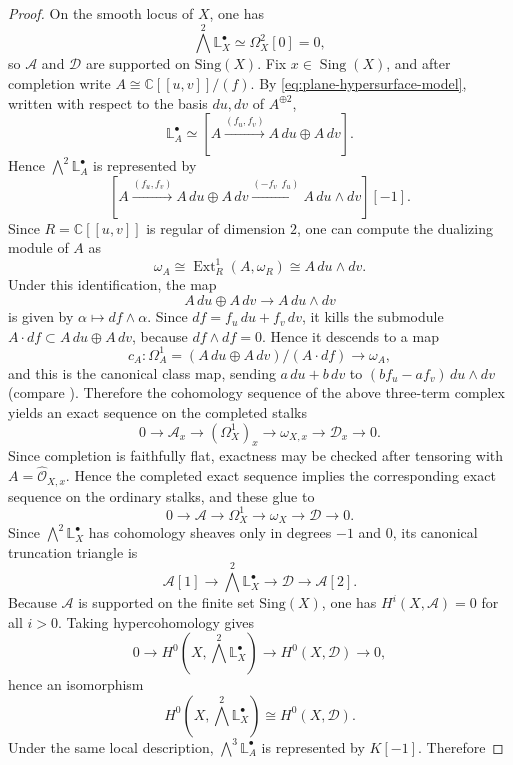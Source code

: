 \documentclass[12pt,reqno]{amsart}
\begin{document}
\begin{proof}
On the smooth locus of \(X\), one has
\[
\bigwedge^2\mathbb{L}^{\bullet}_X\simeq \Omega_X^2[0]=0,
\]
so \(\mathcal A\) and \(\mathcal D\) are supported on \(\mathrm{Sing}(X)\).
Fix \(x\in \operatorname{Sing}(X)\), and after completion write \(A\cong \mathbb{C}[[u,v]]/(f)\). By \eqref{eq:plane-hypersurface-model}, written with respect to the basis \(du,dv\) of \(A^{\oplus 2}\),
\[
\mathbb{L}^{\bullet}_A\simeq \left[A\xrightarrow{(f_u,f_v)}A\,du\oplus A\,dv\right].
\]
Hence \(\bigwedge^2\mathbb{L}^{\bullet}_A\) is represented by
\[
\left[
A\xrightarrow{(f_u,f_v)}
A\,du\oplus A\,dv
\xrightarrow{(-f_v\ \ f_u)}
A\,du\wedge dv
\right][-1].
\]
Since \(R=\mathbb{C}[[u,v]]\) is regular of dimension \(2\), one can compute the dualizing module of \(A\) as 
\[
\omega_A\cong \operatorname{Ext}^1_R(A,\omega_R)\cong A\,du\wedge dv.
\]
Under this identification, the map
\[
A\,du\oplus A\,dv\longrightarrow A\,du\wedge dv
\]
is given by \(\alpha\mapsto df\wedge \alpha\). Since \(df=f_u\,du+f_v\,dv\), it kills the
submodule \(A\cdot df\subset A\,du\oplus A\,dv\), because \(df\wedge df=0\). Hence it descends to a map
\[
c_A:\Omega_A^1=(A\,du\oplus A\,dv)/(A\cdot df)\longrightarrow \omega_A,
\]
and this is the canonical class map, sending \(a\,du+b\,dv\) to \((bf_u-af_v)\,du\wedge dv\)
(compare \cite[\href{https://stacks.math.columbia.edu/tag/0E9X}{Section 0E9X}]{stacks-project}). Therefore the cohomology sequence of the above three-term complex yields an exact sequence on the completed stalks
\[
0\to \mathcal A_x\to (\Omega_X^1)_x\to \omega_{X,x}\to \mathcal D_x\to 0.
\]
Since completion is faithfully flat, exactness may be checked after tensoring with
\(A=\widehat{\mathcal O}_{X,x}\). Hence the completed exact sequence implies the corresponding exact sequence on the ordinary stalks, and these glue to
\[
0\to \mathcal A\to \Omega_X^1\to \omega_X\to \mathcal D\to 0.
\]
Since \(\bigwedge^2\mathbb{L}^{\bullet}_X\) has cohomology sheaves only in degrees \(-1\) and \(0\), its canonical truncation triangle is
\[
\mathcal A[1]\longrightarrow \bigwedge^2\mathbb{L}^{\bullet}_X\longrightarrow \mathcal D\longrightarrow \mathcal A[2].
\]
Because \(\mathcal A\) is supported on the finite set \(\mathrm{Sing}(X)\), one has \(H^i(X,\mathcal A)=0\) for all \(i>0\). Taking hypercohomology gives
\[
0\longrightarrow H^0\!\left(X,\bigwedge^2\mathbb{L}^{\bullet}_X\right)\longrightarrow H^0(X,\mathcal D)\longrightarrow 0,
\]
hence an isomorphism
\[
H^0\!\left(X,\bigwedge^2\mathbb{L}^{\bullet}_X\right)\cong H^0(X,\mathcal D).
\]
Under the same local description, \(\bigwedge^3\mathbb{L}^{\bullet}_A\) is represented by \(K[-1]\). Therefore

\end{proof}
\end{document}
